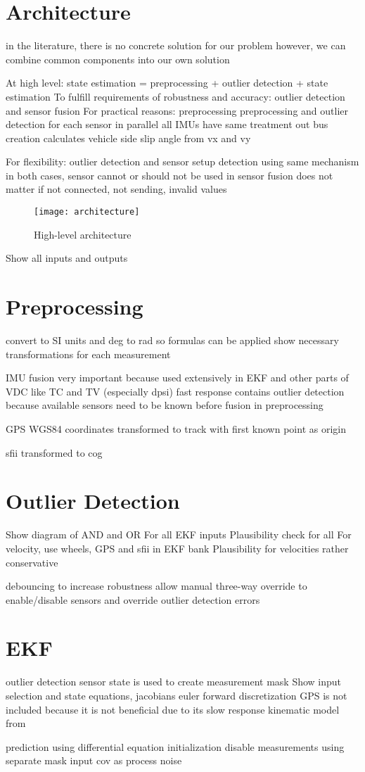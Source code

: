 \section{Architecture}
in the literature, there is no concrete solution for our problem
however, we can combine common components into our own solution

At high level: state estimation = preprocessing + outlier detection + state estimation
To fulfill requirements of robustness and accuracy: outlier detection and sensor fusion
For practical reasons: preprocessing
preprocessing and outlier detection for each sensor in parallel
all IMUs have same treatment
out bus creation calculates vehicle side slip angle from vx and vy

For flexibility: outlier detection and sensor setup detection using same mechanism
in both cases, sensor cannot or should not be used in sensor fusion
does not matter if not connected, not sending, invalid values

\begin{figure}[h]
	\centering
	\texttt{[image: architecture]}%
	\caption{High-level architecture}
	\label{fig:architecture}
\end{figure}
Show all inputs and outputs

\section{Preprocessing}
convert to SI units and deg to rad so formulas can be applied
show necessary transformations for each measurement

IMU fusion
very important because used extensively in EKF and other parts of VDC like TC and TV (especially dpsi)
fast response
contains outlier detection because available sensors need to be known before fusion in preprocessing

GPS WGS84 coordinates transformed to track with first known point as origin

sfii transformed to \gls{cog}

\section{Outlier Detection}
Show diagram of AND and OR
For all EKF inputs
Plausibility check for all
For velocity, use wheels, GPS and sfii in EKF bank
Plausibility for velocities rather conservative

debouncing to increase robustness
allow manual three-way override to enable/disable sensors and override outlier detection errors

\section{EKF}
outlier detection sensor state is used to create measurement mask
Show input selection and state equations, jacobians
euler forward discretization
GPS is not included because it is not beneficial due to its slow response
kinematic model from~\cite[p.~156]{AlexanderWischnewski.2019}


prediction using differential equation
initialization
disable measurements using separate mask
input cov as process noise

